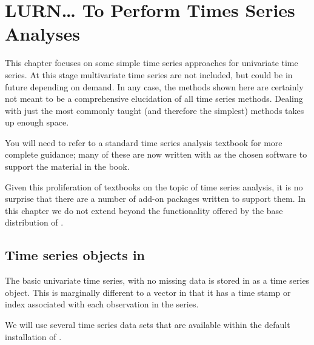 



\chapter{LURN\ldots{} To Perform Times Series Analyses} 
\label{TimeSeries} 
 



 
This chapter focuses on some simple time series approaches for univariate time series. At this stage multivariate time series are not included, but could be in future depending on demand. In any case, the methods shown here are certainly not meant to be a comprehensive elucidation of all time series methods. Dealing with just the most commonly taught (and therefore the simplest) methods takes up enough space.  
 
You will need to refer to a standard time series analysis textbook for more complete guidance; many of these are now written with \R{} as the chosen software to support the material in the book. 
 
Given this proliferation of textbooks on the topic of time series analysis, it is no surprise that there are a number of add-on packages written to support them. In this chapter we do not extend beyond the functionality offered by the base distribution of \R{}. 
 
\section{Time series objects in \R{}} 
 
The basic univariate time series, with no missing data is stored in \R{} as a time series object. This is marginally different to a vector in that it has a time stamp or index associated with each observation in the series. 
 
We will use several time series data sets that are available within the default installation of \R{}.  

